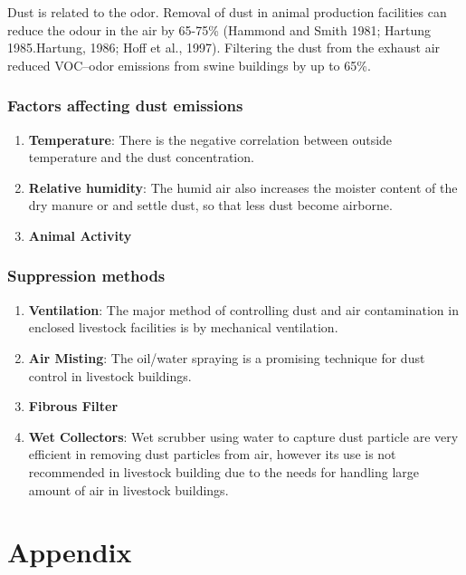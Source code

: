 \documentclass[]{book}
\providecommand{\tightlist}{%
  \setlength{\itemsep}{0pt}\setlength{\parskip}{0pt}}
\begin{document}
Dust is related to the odor. Removal of dust in animal production facilities can reduce the odour in the air by 65-75\% (Hammond and Smith 1981; Hartung 1985.Hartung, 1986; Hoff et al., 1997). Filtering the dust from the exhaust air reduced VOC--odor emissions from swine buildings by up to 65\%.

\hypertarget{factors-affecting-dust-emissions}{%
\subsubsection{Factors affecting dust emissions}\label{factors-affecting-dust-emissions}}

\begin{enumerate}
\def\labelenumi{\arabic{enumi}.}
\tightlist
\item
  \textbf{Temperature}: There is the negative correlation between outside temperature and the dust concentration.
\item
  \textbf{Relative humidity}: The humid air also increases the moister content of the dry manure or and settle dust, so that less dust become airborne.
\item
  \textbf{Animal Activity}
\end{enumerate}

\hypertarget{suppression-methods-2}{%
\subsubsection{Suppression methods}\label{suppression-methods-2}}

\begin{enumerate}
\def\labelenumi{\arabic{enumi}.}
\tightlist
\item
  \textbf{Ventilation}: The major method of controlling dust and air contamination in enclosed livestock facilities is by mechanical ventilation.
\item
  \textbf{Air Misting}: The oil/water spraying is a promising technique for dust control in livestock buildings.
\item
  \textbf{Fibrous Filter}
\item
  \textbf{Wet Collectors}: Wet scrubber using water to capture dust particle are very efficient in removing dust particles from air, however its use is not recommended in livestock building due to the needs for handling large amount of air in livestock buildings.
\end{enumerate}

\hypertarget{appendix-2}{%
\section{Appendix}\label{appendix-2}}
\end{document}
